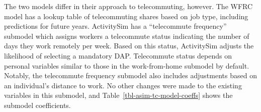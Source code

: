 \documentclass[fancy, twoside, mastersfancy, ms]{byuthesis}
\begin{document}
\begin{table}

\caption{\label{tbl-asim-wfh-model-coeffs}Work-From-Home Submodel Choice
Coefficients in ActivitySim}


\end{table}%

The two models differ in their approach to telecommuting, however. The
WFRC model has a lookup table of telecommuting shares based on job type,
including predictions for future years. ActivitySim has a ``telecommute
frequency'' submodel which assigns workers a telecommute status
indicating the number of days they work remotely per week. Based on this
status, ActivitySim adjusts the likelihood of selecting a mandatory DAP.
Telecommute status depends on personal variables similar to those in the
work-from-home submodel by default. Notably, the telecommute frequency
submodel also includes adjustments based on an individual's distance to
work. No other changes were made to the existing variables in this
submodel, and Table~\ref{tbl-asim-tc-model-coeffs} shows the submodel
coefficients.
\end{document}
